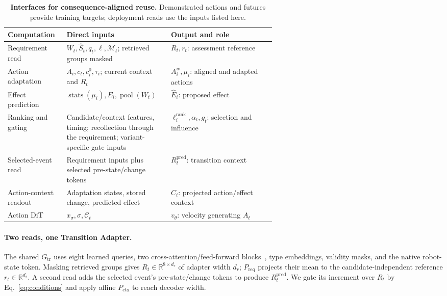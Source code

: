 \begin{table}[!htbp]
\centering\small
\caption{\textbf{Interfaces for consequence-aligned reuse.} Demonstrated actions and futures provide training targets; deployment reads use the inputs listed here.}
\label{tab:app_visibility}
\begin{tabularx}{\linewidth}{@{}>{\raggedright\arraybackslash}p{0.22\linewidth}>{\raggedright\arraybackslash}p{0.39\linewidth}>{\raggedright\arraybackslash}X@{}}
\toprule
Computation & Direct inputs & Output and role \\
\midrule
Requirement read & $W_t,\widehat S_t,q_t,\ell,\mathcal M_t$; retrieved groups masked & $R_t,r_t$: assessment reference \\
Action adaptation & $A_i,c_t,c_i^0,\tau_i$; current context and $R_t$ & $A_i^w,\mu_i$: aligned and adapted actions \\
Effect prediction & $\operatorname{stats}(\mu_i),E_i,\operatorname{pool}(W_t)$ & $\widehat E_i$: proposed effect \\
Ranking and gating & Candidate/context features, timing; recollection through the requirement; variant-specific gate inputs & $\ell_i^{\mathrm{rank}},\alpha_t,g_t$: selection and influence \\
Selected-event read & Requirement inputs plus selected pre-state/change tokens & $R_t^{\mathrm{pred}}$: transition context \\
Action-context readout & Adaptation states, stored change, predicted effect & $C_i$: projected action/effect context \\
Action DiT & $x_\sigma,\sigma,\mathcal C_t$ & $v_\theta$: velocity generating $A_t$ \\
\bottomrule
\end{tabularx}
\end{table}

\paragraph{Two reads, one Transition Adapter.}
The shared $G_{\mathrm{tr}}$ uses eight learned queries, two cross-attention/feed-forward blocks~\citep{vaswani2017attention}, type embeddings, validity masks, and the native robot-state token.
Masking retrieved groups gives $R_t\in\mathbb R^{8\times d_r}$ of adapter width $d_r$; $P_{\mathrm{req}}$ projects their mean to the candidate-independent reference $r_t\in\mathbb R^{d_s}$.
A second read adds the selected event's pre-state/change tokens to produce $R_t^{\mathrm{pred}}$.
We gate its increment over $R_t$ by Eq.~\eqref{eq:conditions} and apply affine $P_{\mathrm{ctx}}$ to reach decoder width.

